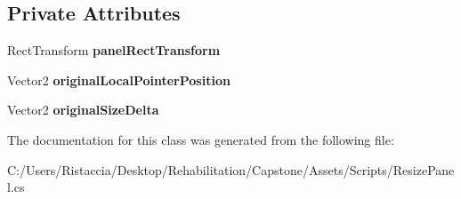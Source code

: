 \subsection*{Private Attributes}
\begin{DoxyCompactItemize}
\item 
\mbox{\label{class_resize_panel_ad3bb710f4e1e0e9f080f42f83f742e60}} 
Rect\+Transform {\bfseries panel\+Rect\+Transform}
\item 
\mbox{\label{class_resize_panel_aa66755d795b4d899195ef90b1fc32942}} 
Vector2 {\bfseries original\+Local\+Pointer\+Position}
\item 
\mbox{\label{class_resize_panel_a06ad9621a0fa664176d54a78b6c12450}} 
Vector2 {\bfseries original\+Size\+Delta}
\end{DoxyCompactItemize}


The documentation for this class was generated from the following file\+:\begin{DoxyCompactItemize}
\item 
C\+:/\+Users/\+Ristaccia/\+Desktop/\+Rehabilitation/\+Capstone/\+Assets/\+Scripts/Resize\+Panel.\+cs\end{DoxyCompactItemize}
